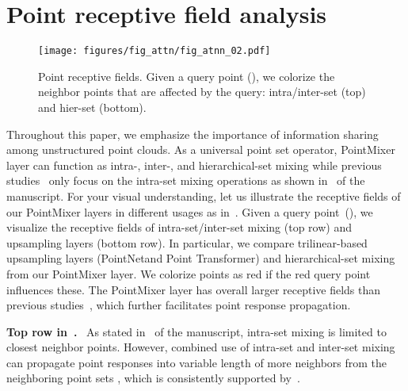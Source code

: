 %
 
\section{Point receptive field analysis}
\label{sec:receptive}
\begin{figure}[!t]
\centering
\texttt{[image: figures/fig\_attn/fig\_atnn\_02.pdf]}
\caption{Point receptive fields. Given a query point (), we colorize the neighbor points that are affected by the query: intra/inter-set (top) and hier-set (bottom).}
\label{fig:fig_attn}
\end{figure} 

Throughout this paper, we emphasize the importance of information sharing among unstructured point clouds. As a universal point set operator, PointMixer layer can function as intra-, inter-, and hierarchical-set mixing while previous studies~\cite{pointnet++,point-transformer,xu2021paconv} only focus on the intra-set mixing operations as shown in~ of the manuscript.
For your visual understanding, let us illustrate the receptive fields of our PointMixer layers in different usages as in~.
Given a query point~(), we visualize the receptive fields of intra-set/inter-set mixing (top row) and upsampling layers (bottom row). In particular, we compare trilinear-based upsampling layers (PointNet\plusplus and Point Transformer) and hierarchical-set mixing from our PointMixer layer. We colorize points as red if the red query point influences these. The PointMixer layer has overall larger receptive fields than previous studies~\cite{pointnet++,point-transformer}, which further facilitates point response propagation.

\noindent \textbf{Top row in~.} \ 
As stated in~ of the manuscript, intra-set mixing is limited to  closest neighbor points. However, combined use of intra-set and inter-set mixing can propagate point responses into variable length of more neighbors from the neighboring point sets , which is consistently supported by~. 


